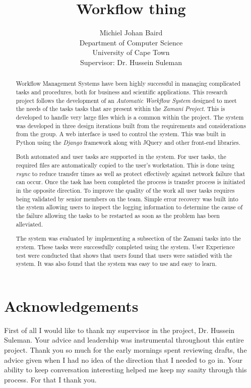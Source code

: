 \documentclass[12pt,a4paper]{report}
\title{Workflow thing}
\author{Michiel Johan Baird \\
        Department of Computer Science \\
        University of Cape Town
    \\   \small{Supervisor: Dr. Hussein Suleman} }
\begin{document}

\begin{abstract}
Workflow Management Systems have been highly successful in managing complicated
tasks and procedures, both for business and scientific applications. This
research project follows the development of an \emph{Automatic Workflow System}
designed to meet the needs of the tasks tasks that are present within the
\emph{Zamani Project}. This is developed to handle very large files which is a
common within the project. The system was developed in three design iterations
built from the requirements and considerations from the group. A web interface
is used to control the system. This was built in Python using the \emph{Django}
framework along with JQuery and other front-end libraries.

Both automated and user tasks are supported in the system. For user tasks, the
required files are automatically copied to the user's workstation. This is done
using \emph{rsync} to reduce transfer times as well as protect effectively
against network failure that can occur. Once the task has been completed the
process is transfer process is initiated in the opposite direction. To improve
the quality of the work all user tasks requires being validated by senior
members on the team. Simple error recovery was built into the system allowing
users to inspect the logging information to determine the cause of the failure
allowing the tasks to be restarted as soon as the problem has been alleviated.

The system was evaluated by implementing a subsection of the Zamani tasks into the
system. These tasks were successfully completed using the system. User
Experience test were conducted that shows that users found that users were
satisfied with the system. It was also found that the system was easy to use and
easy to learn.


\end{abstract}
\chapter*{Acknowledgements}
First of all I would like to thank my supervisor in the project, Dr. Hussein
Suleman. Your advice and leadership was instrumental throughout this entire
project. Thank you so much for the early mornings spent reviewing drafts, the
advice given when I had no idea of the direction that I needed to go in. Your
ability to keep conversation interesting helped me keep my sanity through this
process. For that I thank you.
\end{document}
